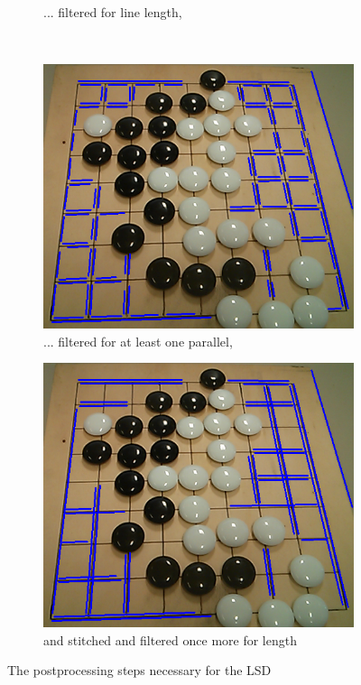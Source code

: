 \begin{figure}
\begin{center}
\begin{subfigure}{0.33\textwidth}
			\caption{... filtered for line length,}
			\label{fig:lsdPostprocessingLength}
		\end{subfigure}
		\\
		\begin{subfigure}{0.33\textwidth}
			\includegraphics[width=\textwidth]{images/lsd_parallel.png}
			\caption{... filtered for at least one parallel, }
			\label{fig:lsdPostprocessingParallel}
		\end{subfigure}
		\hspace{2em}
		\begin{subfigure}{0.33\textwidth}
			\includegraphics[width=\textwidth]{images/lsd_final.png}
			\caption{and stitched and filtered once more for length}
			\label{fig:lsdPostprocessingFinal}
		\end{subfigure}

		\caption{The postprocessing steps necessary for the LSD}
	\end{center}
	\end{figure}


